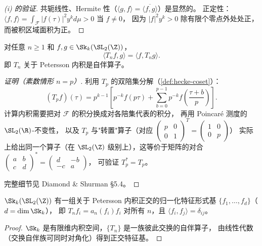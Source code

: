 \begin{proof}[(i) 的验证]
共轭线性、Hermite 性（$\langle g, f \rangle = \overline{\langle f, g \rangle}$）是显然的。
正定性：$\langle f, f \rangle = \int_\mathcal{F} |f(\tau)|^2 y^k d\mu > 0$ 当 $f \neq 0$，
因为 $|f|^2 y^k > 0$ 除有限个零点外处处正，而被积区域面积为正。
\end{proof}

\begin{theorem}
\label{thm:hecke-selfadjoint}
对任意 $n \geq 1$ 和 $f, g \in \Sk_k(\SL_2(\Z))$，
\[
  \langle T_n f, g \rangle = \langle f, T_n g \rangle.
\]
即 $T_n$ 关于 Petersson 内积是自伴算子。
\end{theorem}

\begin{proof}[证明（素数情形 $n = p$）]
利用 $T_p$ 的双陪集分解（\cref{def:hecke-coset}）：
\[
  (T_p f)(\tau) = p^{k-1} \left[
    p^{-k} f(p\tau) + \sum_{b=0}^{p-1} p^{-k} f\!\left(\frac{\tau+b}{p}\right)
  \right].
\]
计算内积需要把对 $\mathcal{F}$ 的积分换成对各陪集代表的积分，
再用 Poincaré 测度的 $\SL_2(\R)$-不变性，
以及 $T_p$ 与"转置"算子（对应 $\begin{pmatrix}p&0\\0&1\end{pmatrix}^T = \begin{pmatrix}1&0\\0&p\end{pmatrix}$）
实际上给出同一个算子（在 $\SL_2(\Z)$ 级别上），这等价于矩阵的对合
$\begin{pmatrix}a&b\\c&d\end{pmatrix}^* = \begin{pmatrix}d&-b\\-c&a\end{pmatrix}$，
可验证 $T_p^* = T_p$。

完整细节见 Diamond \& Shurman §5.4。
\end{proof}

\begin{corollary}[特征形式正交基]
\label{cor:eigenform-basis}
$\Sk_k(\SL_2(\Z))$ 有一组关于 Petersson 内积正交的归一化特征形式基
$\{f_1, \ldots, f_d\}$（$d = \dim \Sk_k$），
即 $T_n f_i = a_n(f_i) f_i$ 对所有 $n$，且 $\langle f_i, f_j \rangle = \delta_{ij}$。
\end{corollary}

\begin{proof}
$\Sk_k$ 是有限维内积空间，$\{T_n\}$ 是一族彼此交换的自伴算子，
由线性代数（交换自伴族可同时对角化）得到正交特征基。
\end{proof}

